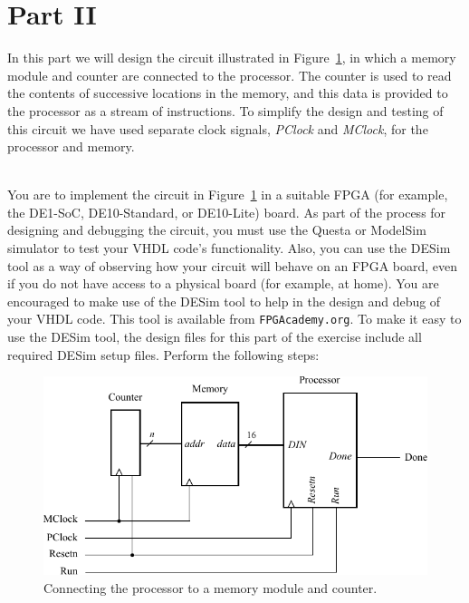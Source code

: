 \documentclass[epsfig,10pt,fullpage]{article} \addtolength{\textwidth}{1.5in}
\begin{document}
\newpage
\section*{Part II}
In this part we will design the circuit illustrated in Figure~\ref{fig:fig4}, in which a 
memory module and counter are connected to the processor. The
counter is used to read the contents of successive locations in the memory, and
this data is provided to the processor as a stream of instructions. To simplify the
design and testing of this circuit we have used separate clock signals, {\it PClock} 
and {\it MClock}, for the processor and memory. 

~\\
You are to implement the circuit in Figure~\ref{fig:fig4} in a suitable FPGA (for example, 
the DE1-SoC, DE10-Standard, or DE10-Lite) board. As part of the process for designing and 
debugging the circuit, you must use the Questa or ModelSim simulator to test your 
VHDL code's functionality. Also, you can use the DESim tool as a way of 
observing how your circuit will behave on an FPGA board, even if you do not have access to 
a physical board (for example, at home). You are encouraged to make use of the
DESim tool to help in the design and debug of your VHDL code. This tool is available
from \texttt{FPGAcademy.org}. To make it easy to use the DESim tool, the design files for 
this part of the exercise include all required DESim setup files. Perform the following steps:

\begin{figure}[h]
	\begin{center}
		\includegraphics[]{figures/figure4.pdf}
	\end{center}
	\caption{Connecting the processor to a memory module and counter.}
	\label{fig:fig4}
\end{figure}
\end{document}
